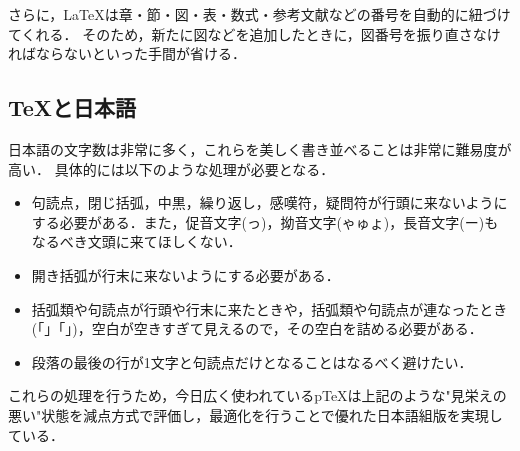 さらに，\LaTeX は章・節・図・表・数式・参考文献などの番号を自動的に紐づけてくれる．
そのため，新たに図などを追加したときに，図番号を振り直さなければならないといった手間が省ける．

\subsection{\TeX と日本語}

日本語の文字数は非常に多く，これらを美しく書き並べることは非常に難易度が高い．
具体的には以下のような処理が必要となる．
\begin{itemize}
  \item 句読点，閉じ括弧，中黒，繰り返し，感嘆符，疑問符が行頭に来ないようにする必要がある．また，促音文字(っ)，拗音文字(ゃゅょ)，長音文字(ー)もなるべき文頭に来てほしくない．
  \item 開き括弧が行末に来ないようにする必要がある．
  \item 括弧類や句読点が行頭や行末に来たときや，括弧類や句読点が連なったとき(「」「」)，空白が空きすぎて見えるので，その空白を詰める必要がある．
  \item 段落の最後の行が1文字と句読点だけとなることはなるべく避けたい．
\end{itemize}

これらの処理を行うため，今日広く使われているp\TeX は上記のような"見栄えの悪い"状態を減点方式で評価し，最適化を行うことで優れた日本語組版を実現している．
